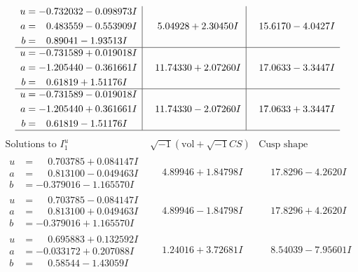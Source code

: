 \documentclass[1p]{elsarticle_modified}
\theoremstyle{definition}
\newcommand{\I}{\sqrt{-1}}
\begin{document}
$$\begin{array}{c|c|c}
\begin{aligned}
u &= -0.732032 - 0.098973 I \\
a &= \phantom{-}0.483559 - 0.553909 I \\
b &= \phantom{-}0.89041 - 1.93513 I\end{aligned}
 & \phantom{-}5.04928 + 2.30450 I & \phantom{-}15.6170 - 4.0427 I \\ \hline\begin{aligned}
u &= -0.731589 + 0.019018 I \\
a &= -1.205440 - 0.361661 I \\
b &= \phantom{-}0.61819 + 1.51176 I\end{aligned}
 & \phantom{-}11.74330 + 2.07260 I & \phantom{-}17.0633 - 3.3447 I \\ \hline\begin{aligned}
u &= -0.731589 - 0.019018 I \\
a &= -1.205440 + 0.361661 I \\
b &= \phantom{-}0.61819 - 1.51176 I\end{aligned}
 & \phantom{-}11.74330 - 2.07260 I & \phantom{-}17.0633 + 3.3447 I\\
 \hline 
 \end{array}$$\newpage$$\begin{array}{c|c|c}  
\text{Solutions to }I^u_{1}& \I (\text{vol} + \sqrt{-1}CS) & \text{Cusp shape}\\
 \hline 
\begin{aligned}
u &= \phantom{-}0.703785 + 0.084147 I \\
a &= \phantom{-}0.813100 - 0.049463 I \\
b &= -0.379016 - 1.165570 I\end{aligned}
 & \phantom{-}4.89946 + 1.84798 I & \phantom{-}17.8296 - 4.2620 I \\ \hline\begin{aligned}
u &= \phantom{-}0.703785 - 0.084147 I \\
a &= \phantom{-}0.813100 + 0.049463 I \\
b &= -0.379016 + 1.165570 I\end{aligned}
 & \phantom{-}4.89946 - 1.84798 I & \phantom{-}17.8296 + 4.2620 I \\ \hline\begin{aligned}
u &= \phantom{-}0.695883 + 0.132592 I \\
a &= -0.033172 + 0.207088 I \\
b &= \phantom{-}0.58544 - 1.43059 I\end{aligned}
 & \phantom{-}1.24016 + 3.72681 I & \phantom{-}8.54039 - 7.95601 I \\ \hline\begin{aligned}

\end{aligned}
\end{array}$$
\end{document}
